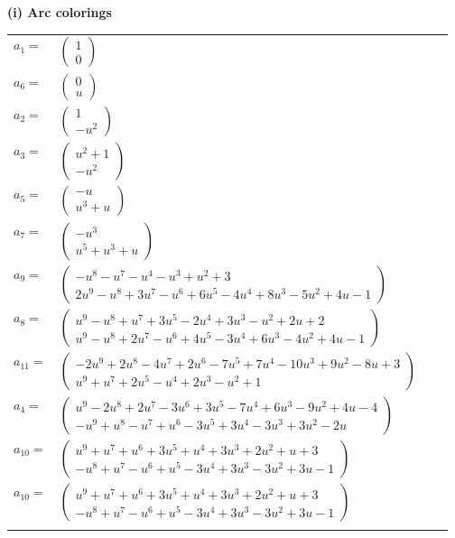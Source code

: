 \documentclass[1p]{elsarticle_modified}
\theoremstyle{definition}
\begin{document}
\flushleft \textbf{(i) Arc colorings}\\
\begin{tabular}{m{7pt} m{180pt} m{7pt} m{180pt} }
\flushright $a_{1}=$&$\begin{pmatrix}1\\0\end{pmatrix}$ \\
\flushright $a_{6}=$&$\begin{pmatrix}0\\u\end{pmatrix}$ \\
\flushright $a_{2}=$&$\begin{pmatrix}1\\- u^2\end{pmatrix}$ \\
\flushright $a_{3}=$&$\begin{pmatrix}u^2+1\\- u^2\end{pmatrix}$ \\
\flushright $a_{5}=$&$\begin{pmatrix}- u\\u^3+u\end{pmatrix}$ \\
\flushright $a_{7}=$&$\begin{pmatrix}- u^3\\u^5+u^3+u\end{pmatrix}$ \\
\flushright $a_{9}=$&$\begin{pmatrix}- u^8- u^7- u^4- u^3+u^2+3\\2 u^9- u^8+3 u^7- u^6+6 u^5-4 u^4+8 u^3-5 u^2+4 u-1\end{pmatrix}$ \\
\flushright $a_{8}=$&$\begin{pmatrix}u^9- u^8+u^7+3 u^5-2 u^4+3 u^3- u^2+2 u+2\\u^9- u^8+2 u^7- u^6+4 u^5-3 u^4+6 u^3-4 u^2+4 u-1\end{pmatrix}$ \\
\flushright $a_{11}=$&$\begin{pmatrix}-2 u^9+2 u^8-4 u^7+2 u^6-7 u^5+7 u^4-10 u^3+9 u^2-8 u+3\\u^9+u^7+2 u^5- u^4+2 u^3- u^2+1\end{pmatrix}$ \\
\flushright $a_{4}=$&$\begin{pmatrix}u^9-2 u^8+2 u^7-3 u^6+3 u^5-7 u^4+6 u^3-9 u^2+4 u-4\\- u^9+u^8- u^7+u^6-3 u^5+3 u^4-3 u^3+3 u^2-2 u\end{pmatrix}$ \\
\flushright $a_{10}=$&$\begin{pmatrix}u^9+u^7+u^6+3 u^5+u^4+3 u^3+2 u^2+u+3\\- u^8+u^7- u^6+u^5-3 u^4+3 u^3-3 u^2+3 u-1\end{pmatrix}$\\ \flushright $a_{10}=$&$\begin{pmatrix}u^9+u^7+u^6+3 u^5+u^4+3 u^3+2 u^2+u+3\\- u^8+u^7- u^6+u^5-3 u^4+3 u^3-3 u^2+3 u-1\end{pmatrix}$\\&\end{tabular}
\end{document}
